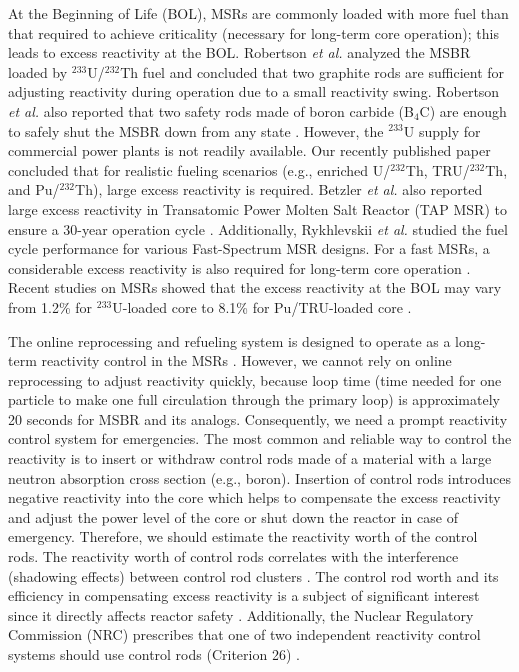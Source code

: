 At the Beginning of Life (BOL), MSRs are commonly loaded with more
fuel than that required to achieve criticality (necessary for long-term core 
operation); this leads to excess reactivity at the BOL. Robertson \emph{et al.} analyzed the \gls{MSBR} loaded by $^{233}$U/$^{232}$Th fuel and concluded that two graphite rods are sufficient for adjusting reactivity during operation due to a small reactivity swing. Robertson \emph{et al.} also reported that two safety rods made of boron carbide (B$_4$C) are enough to safely shut the \gls{MSBR} down from any state \cite{robertson_conceptual_1971}. However, the $^{233}$U supply for commercial power plants is not readily available. Our recently published paper \cite{ashraf2020Strategies} concluded that for realistic fueling scenarios (e.g., enriched U/$^{232}$Th, TRU/$^{232}$Th, and Pu/$^{232}$Th), large excess reactivity is required. Betzler \emph{et al.} also reported large excess reactivity in Transatomic Power Molten Salt Reactor (TAP MSR) to ensure a 30-year operation cycle \cite{betzler2017assessment}. Additionally, Rykhlevskii \emph{et al.} studied the fuel cycle performance for various Fast-Spectrum \gls{MSR} designs. For a fast MSRs, a considerable excess reactivity is also required for long-term core operation \cite{rykhlevskii_fuel_2019}. Recent studies on MSRs showed that the excess reactivity 
at the BOL may vary from 1.2\% for $^{233}$U-loaded core \cite{rykhlevskii2019modeling,betzler2016modeling} to 8.1\% for Pu/TRU-loaded core \cite{ashraf2020Strategies}.

The online reprocessing and refueling system is designed to operate as a long-term reactivity control in the MSRs \cite{ashraf2019modeling,ashraf2019Preliminary}. However, we cannot rely on online reprocessing to adjust reactivity quickly, because loop time (time needed for one particle to make one full circulation through the primary loop) is approximately 20 seconds for MSBR and its analogs. Consequently, we need a prompt reactivity control system for emergencies. The most common and reliable way to control the reactivity is to insert or withdraw control rods made of a material with a large neutron absorption cross section (e.g., boron).
Insertion of control rods introduces negative reactivity into the 
core which helps to compensate the excess reactivity and 
adjust the power level of the core or shut down the reactor in case of 
emergency. Therefore, we should estimate 
the reactivity worth of the control rods.
The reactivity worth of control rods correlates with the interference 
(shadowing effects) between control rod clusters 
\cite{vcerba2017optimization}. 
The control rod worth and its efficiency in compensating excess reactivity is a subject of significant interest since it directly affects reactor safety \cite{atkinson2019small}. Additionally, the Nuclear Regulatory Commission (NRC) prescribes that one of two independent reactivity control systems should use control rods (Criterion 26) \cite{nuclear1987standard}.

